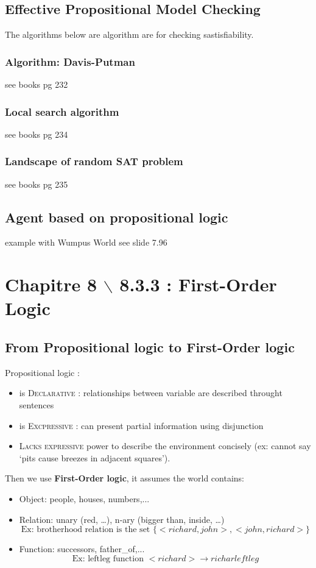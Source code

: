 \subsection{Effective Propositional Model Checking}
The algorithms below are algorithm are for checking sastisfiability. 
\subsubsection{Algorithm: Davis-Putman}
see books pg 232
\subsubsection{Local search algorithm}
see books pg  234
\subsubsection{Landscape of random SAT problem}
see books pg 235

\subsection{Agent based on propositional logic}
example with Wumpus World see slide 7.96

\section{Chapitre 8 $\backslash$ 8.3.3 : First-Order Logic }

\subsection{From Propositional logic to First-Order logic}

 Propositional logic :
 \begin{itemize}
     \item is \textsc{Declarative} : relationships between variable are described throught sentences
     \item is \textsc{Excpressive} : can present partial information using disjunction
     \item \textsc{Lacks expressive}  power to describe the environment
     concisely (ex:  cannot say `pits  cause breezes in  adjacent squares').
\end{itemize}
 
 Then we use \textbf{First-Order logic}, it assumes the world contains:

	\begin{itemize}
		\item Object: people, houses, numbers,...
		\item Relation: unary (red, \ldots), n-ary (bigger than, inside, \ldots)
            $$\textrm{Ex: brotherhood relation is the set } \{<richard, john>, <john, richard>\}$$
		\item Function: successors, father\_of,...
            $$\textrm{Ex: leftleg function } <richard> \to richar leftleg$$
	\end{itemize}

